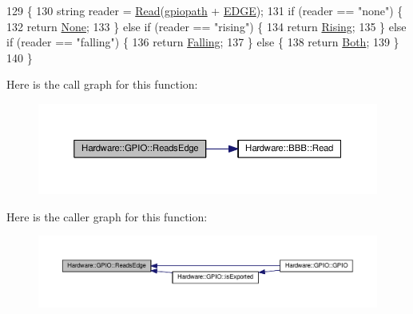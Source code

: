 \begin{DoxyCode}
129                                                \{
130   \textcolor{keywordtype}{string} reader = \hyperlink{class_hardware_1_1_b_b_b_a8b287ded7bcb2cfab361d1fca2b62e9f}{Read}(\hyperlink{class_hardware_1_1_g_p_i_o_ac47062ed6aba52b9e8506e1575bf5061}{gpiopath} + \hyperlink{_g_p_i_o_8h_ac243bfa96aa2c28014159ff098bd2324}{EDGE});
131   \textcolor{keywordflow}{if} (reader == \textcolor{stringliteral}{"none"}) \{
132     \textcolor{keywordflow}{return} \hyperlink{class_hardware_1_1_g_p_i_o_a9a7595aabdac9aec75f22e8b86342162aa49ebde2bcdeefb0e7be23fd0fbbdee6}{None};
133   \} \textcolor{keywordflow}{else} \textcolor{keywordflow}{if} (reader == \textcolor{stringliteral}{"rising"}) \{
134     \textcolor{keywordflow}{return} \hyperlink{class_hardware_1_1_g_p_i_o_a9a7595aabdac9aec75f22e8b86342162afbb0aadc6c0311beb25d5a056c61ed46}{Rising};
135   \} \textcolor{keywordflow}{else} \textcolor{keywordflow}{if} (reader == \textcolor{stringliteral}{"falling"}) \{
136     \textcolor{keywordflow}{return} \hyperlink{class_hardware_1_1_g_p_i_o_a9a7595aabdac9aec75f22e8b86342162a0db6d4392aec905f4fd0576c2cba9279}{Falling};
137   \} \textcolor{keywordflow}{else} \{
138     \textcolor{keywordflow}{return} \hyperlink{class_hardware_1_1_g_p_i_o_a9a7595aabdac9aec75f22e8b86342162aa6f3d9102e894c4bf553a679ad2148c3}{Both};
139   \}
140 \}
\end{DoxyCode}


Here is the call graph for this function\+:\nopagebreak
\begin{figure}[H]
\begin{center}
\leavevmode
\includegraphics[width=350pt]{class_hardware_1_1_g_p_i_o_ac5a3c6d1a0ce58a0b2ee0752623810e4_cgraph}
\end{center}
\end{figure}




Here is the caller graph for this function\+:\nopagebreak
\begin{figure}[H]
\begin{center}
\leavevmode
\includegraphics[width=350pt]{class_hardware_1_1_g_p_i_o_ac5a3c6d1a0ce58a0b2ee0752623810e4_icgraph}
\end{center}
\end{figure}



